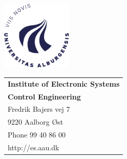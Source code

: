 \thispagestyle{empty}
\noindent
\begin{minipage}[l]{0.50\textwidth}
	\centering
	\includegraphics[width=3.35cm]{frontmatter/AAU_LAT_CIRCLE_blue_rgb}
\end{minipage}
\begin{minipage}[r]{0.50\textwidth}

\noindent
	\begin{tabular}{l}
		{\textsf{\small \textbf{Institute of Electronic Systems}}}\\
		{\textsf{\small \textbf{Control Engineering}}} \\
		{\textsf{\small Fredrik Bajers vej 7}} \\
		{\textsf{\small 9220 Aalborg \O st}} \\
		{\textsf{\small Phone 99 40 86 00}} \\
		{\textsf{\small http://es.aau.dk}}
	\end{tabular}
\end{minipage}


